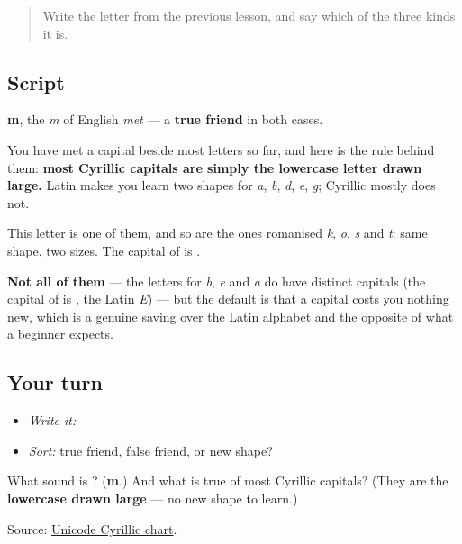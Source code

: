 \label{lesson:RU-W06-m}



\begin{quote}
Write the letter from the previous lesson, and say which of the three kinds it is.
\end{quote}

\subsection*{Script}

\begin{quote}
   
\end{quote}

\textbf{m}, the \emph{m} of English \emph{met} — a \textbf{true friend} in both cases.

You have met a capital beside most letters so far, and here is the rule behind them: \textbf{most Cyrillic capitals are simply the lowercase letter drawn large.} Latin makes you learn two shapes for \emph{a}, \emph{b}, \emph{d}, \emph{e}, \emph{g}; Cyrillic mostly does not.

This letter is one of them, and so are the ones romanised \emph{k}, \emph{o}, \emph{s} and \emph{t}: same shape, two sizes. The capital of \textbf{} is \textbf{}.

\textbf{Not all of them} — the letters for \emph{b}, \emph{e} and \emph{a} do have distinct capitals (the capital of \textbf{} is \textbf{}, the Latin \emph{E}) — but the default is that a capital costs you nothing new, which is a genuine saving over the Latin alphabet and the opposite of what a beginner expects.

\subsection*{Your turn}
\begin{itemize}
\raggedright
  \item \emph{Write it:} 
  \item \emph{Sort:} true friend, false friend, or new shape?
\end{itemize}

\begin{tcolorbox}[breakable,colback=teal!4,colframe=teal!35!black,title={Before you move on}]
What sound is \textbf{}? (\textbf{m}.) And what is true of most Cyrillic capitals? (They are the \textbf{lowercase drawn large} — no new shape to learn.)

Source: \href{https://www.unicode.org/charts/PDF/U0400.pdf}{Unicode Cyrillic chart}.
\end{tcolorbox}
